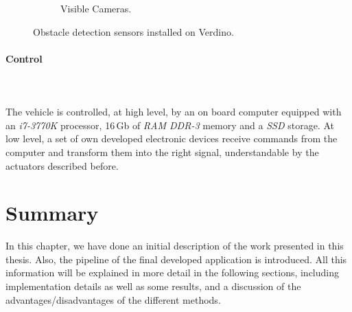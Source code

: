 \begin{figure}[h!]
\begin{subfigure}[b]{0.32\textwidth}
                \caption{Visible Cameras.}\label{fig:cp00_visible_cameras}
        \end{subfigure}%
        \caption{Obstacle detection sensors installed on Verdino.}\label{fig:cp00_detection_sensors}
\end{figure}

\paragraph{Control}\label{ch:chapter00_03_00_00_03}

~\\~\\The vehicle is controlled, at high level, by an on board computer equipped with an \emph{i7-3770K} processor, 16\,Gb of \emph{RAM DDR-3} memory and a \emph{SSD} storage. At low level, a set of own developed electronic devices receive commands from the computer and transform them into the right signal, understandable by the actuators described before.

\section{Summary}\label{ch:chapter00_04}

In this chapter, we have done an initial description of the work presented in this thesis. Also, the pipeline of the final developed application is introduced. All this information will be explained in more detail in the following sections, including implementation details as well as some results, and a discussion of the advantages/disadvantages of the different methods.